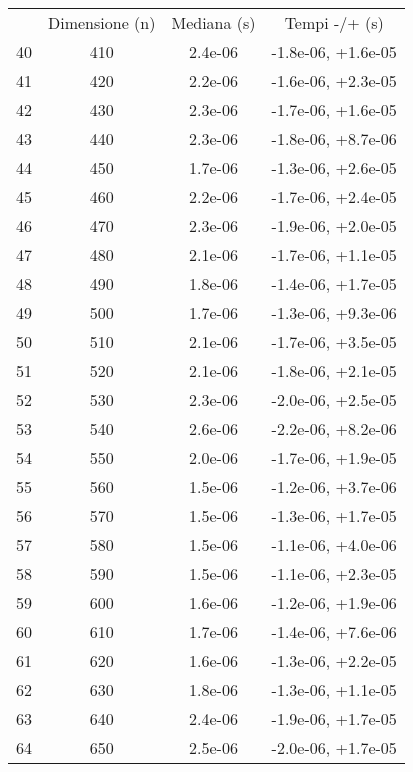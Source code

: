 \begin{table}
\centering
\begin{adjustbox}{width=1\textwidth/2}
\begin{tabular}{|c|c|c|c|}
\hline
 & Dimensione (n) & Mediana (s) & Tempi -/+ (s) \\
40 & 410 & 2.4e-06 & -1.8e-06, +1.6e-05 \\
\cline{1-4}
41 & 420 & 2.2e-06 & -1.6e-06, +2.3e-05 \\
\cline{1-4}
42 & 430 & 2.3e-06 & -1.7e-06, +1.6e-05 \\
\cline{1-4}
43 & 440 & 2.3e-06 & -1.8e-06, +8.7e-06 \\
\cline{1-4}
44 & 450 & 1.7e-06 & -1.3e-06, +2.6e-05 \\
\cline{1-4}
45 & 460 & 2.2e-06 & -1.7e-06, +2.4e-05 \\
\cline{1-4}
46 & 470 & 2.3e-06 & -1.9e-06, +2.0e-05 \\
\cline{1-4}
47 & 480 & 2.1e-06 & -1.7e-06, +1.1e-05 \\
\cline{1-4}
48 & 490 & 1.8e-06 & -1.4e-06, +1.7e-05 \\
\cline{1-4}
49 & 500 & 1.7e-06 & -1.3e-06, +9.3e-06 \\
\cline{1-4}
50 & 510 & 2.1e-06 & -1.7e-06, +3.5e-05 \\
\cline{1-4}
51 & 520 & 2.1e-06 & -1.8e-06, +2.1e-05 \\
\cline{1-4}
52 & 530 & 2.3e-06 & -2.0e-06, +2.5e-05 \\
\cline{1-4}
53 & 540 & 2.6e-06 & -2.2e-06, +8.2e-06 \\
\cline{1-4}
54 & 550 & 2.0e-06 & -1.7e-06, +1.9e-05 \\
\cline{1-4}
55 & 560 & 1.5e-06 & -1.2e-06, +3.7e-06 \\
\cline{1-4}
56 & 570 & 1.5e-06 & -1.3e-06, +1.7e-05 \\
\cline{1-4}
57 & 580 & 1.5e-06 & -1.1e-06, +4.0e-06 \\
\cline{1-4}
58 & 590 & 1.5e-06 & -1.1e-06, +2.3e-05 \\
\cline{1-4}
59 & 600 & 1.6e-06 & -1.2e-06, +1.9e-06 \\
\cline{1-4}
60 & 610 & 1.7e-06 & -1.4e-06, +7.6e-06 \\
\cline{1-4}
61 & 620 & 1.6e-06 & -1.3e-06, +2.2e-05 \\
\cline{1-4}
62 & 630 & 1.8e-06 & -1.3e-06, +1.1e-05 \\
\cline{1-4}
63 & 640 & 2.4e-06 & -1.9e-06, +1.7e-05 \\
\cline{1-4}
64 & 650 & 2.5e-06 & -2.0e-06, +1.7e-05 \\

\end{tabular}
\end{adjustbox}
\end{table}
